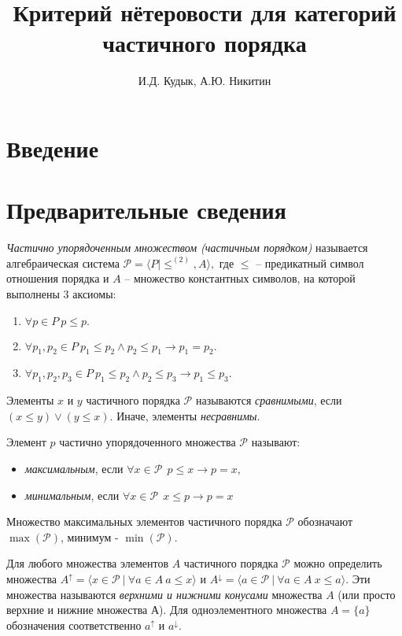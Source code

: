 \documentclass[12pt]{article}
\title{Критерий нётеровости для категорий частичного порядка}
\author{И.Д. Кудык, А.Ю. Никитин}
\theoremstyle{break}
\def\P{\mathcal{P}}
\begin{document}
    \maketitle %
    \thispagestyle{empty} %
    \tableofcontents %
    \newpage
    
    \section{Введение} %

	\section{Предварительные сведения}
			
		\textit{Частично упорядоченным множеством (частичным порядком)} называется алгебраическая система $\P = \langle P | \leqslant^{(2)}, A\rangle,$ где $\leqslant$ -- предикатный символ отношения порядка и $A$ -- множество константных символов, на которой выполнены 3 аксиомы:
		\begin{enumerate}
			\item $\forall p\in P\ p\leqslant p.$
			\item $\forall p_1, p_2\in P\ p_1 \leqslant p_2 \wedge p_2 \leqslant p_1 \rightarrow p_1=p_2.$
			\item $\forall p_1, p_2, p_3\in P\ p_1 \leqslant p_2 \wedge p_2 \leqslant p_3 \rightarrow p_1 \leqslant p_3.$
		\end{enumerate}
		
		Элементы $x$ и $y$ частичного порядка $\P$ называются \textit{сравнимыми}, если $(x\leqslant y)\vee (y\leqslant x).$ Иначе, элементы \textit{несравнимы}.

		Элемент $p$ частично упорядоченного множества $\P$ называют:
		\begin{itemize}
			\item \textit{максимальным}, если $\forall x \in \P \ \ p\leqslant x \rightarrow p = x,$
			\item \textit{минимальным},  если $\forall x \in \P \ \ x\leqslant p \rightarrow p = x$
		\end{itemize}
		Множество максимальных элементов частичного порядка $\P$ обозначают $\max(\P)$, минимум - $\min(\P)$.

	
		Для любого множества элементов $A$ частичного порядка $\P$ можно определить множества $A^{\uparrow} = \langle x\in\P\ |\ \forall a\in A\ a\leqslant x\rangle$ и $A^{\downarrow} = \langle a\in\P\ |\ \forall a\in A\ x\leqslant a\rangle$. Эти множества называются \textit{верхними и нижними конусами} множества $A$ (или просто верхние и нижние множества А). Для одноэлементного множества $A=\{a\}$ обозначения соответственно $a^{\uparrow}$ и $a^{\downarrow}.$
\end{document}
